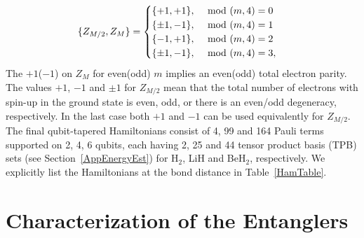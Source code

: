 \documentclass[twocolumn]{revtex4-1}
\newcommand{\1}{\mathbbm{1}}
\begin{document}
\begin{equation}
\{Z_{M/2},Z_M\}=\begin{cases}
\{+1,+1\},\hspace{0.2cm}\mod(m,4)=0\\
\{\pm1,-1\},\hspace{0.2cm}\mod(m,4)=1\\
\{-1,+1\},\hspace{0.2cm}\mod(m,4)=2\\
\{\pm1,-1\},\hspace{0.2cm}\mod(m,4)=3,\\
\end{cases}
\end{equation}
The $+1$($-1$) on $Z_M$ for even(odd) $m$ implies an even(odd) total electron parity. The values $+1$, $-1$ and $\pm 1$ for $Z_{M/2}$ mean that the total number of electrons with spin-up in the ground state is even, odd, or there is an even/odd degeneracy, respectively. In the last case both $+1$ and $-1$ can be used equivalently for $Z_{M/2}$. The final qubit-tapered Hamiltonians consist of 4, 99 and 164 Pauli terms supported on 2, 4, 6 qubits, each having 2, 25 and 44 tensor product basis (TPB) sets (see Section~\ref{AppEnergyEst}) for H$_2$, LiH and BeH$_2$, respectively. We explicitly list the Hamiltonians at the bond distance in Table~\ref{HamTable}.




\section{Characterization of the Entanglers\label{EntSect}}
\end{document}
